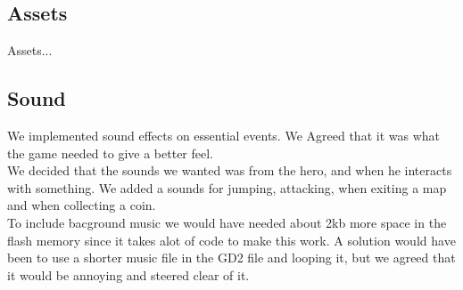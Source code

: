 \subsection{Assets}
Assets...

\subsection{Sound} %

We implemented sound effects on essential events. We Agreed that it was what the game needed to give a better feel.\\
We decided that the sounds we wanted was from the hero, and when he interacts with something. We added a sounds for jumping, attacking, when exiting a map and when collecting a coin.\\
To include bacground music we would have needed about 2kb more space in the flash memory since it takes alot of code to make this work. A solution would have been to use a shorter music file in the GD2 file and looping it, but we agreed that it would be annoying and steered clear of it.

